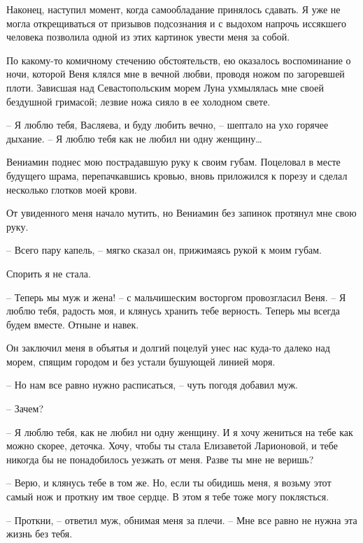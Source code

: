 \documentclass[
]{book}
\begin{document}
Наконец, наступил момент, когда самообладание принялось сдавать. Я уже не могла открещиваться от призывов подсознания и с выдохом напрочь иссякшего человека позволила одной из этих картинок увести меня за собой.

По какому-то комичному стечению обстоятельств, ею оказалось воспоминание о ночи, которой Веня клялся мне в вечной любви, проводя ножом по загоревшей плоти. Зависшая над Севастопольским морем Луна ухмылялась мне своей бездушной гримасой; лезвие ножа сияло в ее холодном свете.

-- Я люблю тебя, Васляева, и буду любить вечно, -- шептало на ухо горячее дыхание. -- Я люблю тебя как не любил ни одну женщину\ldots{}

Вениамин поднес мою пострадавшую руку к своим губам. Поцеловал в месте будущего шрама, перепачкавшись кровью, вновь приложился к порезу и сделал несколько глотков моей крови.

От увиденного меня начало мутить, но Вениамин без запинок протянул мне свою руку.

-- Всего пару капель, -- мягко сказал он, прижимаясь рукой к моим губам.

Спорить я не стала.

-- Теперь мы муж и жена! -- с мальчишеским восторгом провозгласил Веня. -- Я люблю тебя, радость моя, и клянусь хранить тебе верность. Теперь мы всегда будем вместе. Отныне и навек.

Он заключил меня в объятья и долгий поцелуй унес нас куда-то далеко над морем, спящим городом и без устали бушующей линией моря.

-- Но нам все равно нужно расписаться, -- чуть погодя добавил муж.

-- Зачем?

-- Я люблю тебя, как не любил ни одну женщину. И я хочу жениться на тебе как можно скорее, деточка. Хочу, чтобы ты стала Елизаветой Ларионовой, и тебе никогда бы не понадобилось уезжать от меня. Разве ты мне не веришь?

-- Верю, и клянусь тебе в том же. Но, если ты обидишь меня, я возьму этот самый нож и проткну им твое сердце. В этом я тебе тоже могу поклясться.

-- Проткни, -- ответил муж, обнимая меня за плечи. -- Мне все равно не нужна эта жизнь без тебя.

\hypertarget{chapter-86}{%
\chapter{~}\label{chapter-86}}
\end{document}
